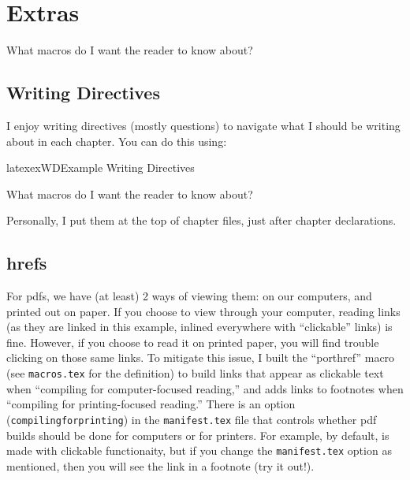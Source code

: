 \chapter{Extras}
\label{chap:extras}

\begin{writingdirectives}

    \item What macros do I want the reader to know about?

\end{writingdirectives}

\section{Writing Directives}
\label{chap:extras:sec:writing-directives}

I enjoy writing directives (mostly questions) to navigate what I should be
writing about in each chapter. You can do this using:

\begin{pseudocode}{latex}{exWD}{Example Writing Directives}
    \begin{writingdirectives}
        \item What macros do I want the reader to know about?
    \end{writingdirectives}
\end{pseudocode}

Personally, I put them at the top of chapter files, just after chapter
declarations.

\section{\acsp{href}}
\label{chap:extras:sec:hrefs}

For \acsp{pdf}, we have (at least) 2 ways of viewing them: on our computers, and
printed out on paper. If you choose to view through your computer, reading links
(as they are linked in this example, inlined everywhere with ``clickable''
links) is fine. However, if you choose to read it on printed paper, you will
find trouble clicking on those same links. To mitigate this issue, I built the
``porthref'' macro (see \texttt{macros.tex} for the definition) to build links
that appear as clickable text when ``compiling for computer-focused reading,''
and adds links to footnotes when ``compiling for printing-focused reading.''
There is an option (\texttt{compilingforprinting}) in the \texttt{manifest.tex}
file that controls whether \acs{pdf} builds should be done for computers or for
printers. For example, by default, 
is made with clickable functionaity, but if you change the \texttt{manifest.tex}
option as mentioned, then you will see the link in a footnote (try it out!).


